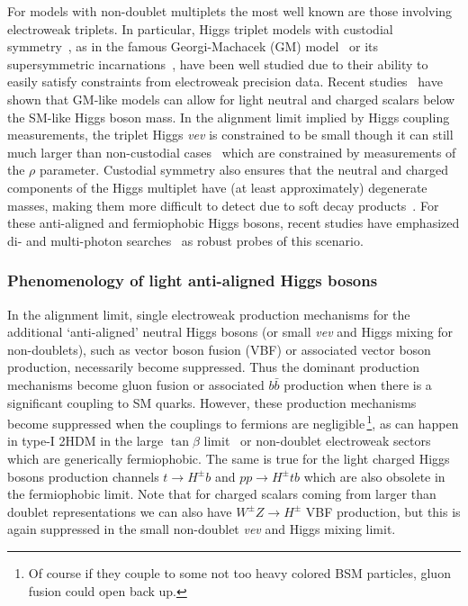 \documentclass[../report.tex]{subfiles}
\begin{document}
For models with non-doublet multiplets the most well known are those involving electroweak triplets. In particular, Higgs triplet models with custodial symmetry~\cite{Sikivie:1980hm}, as in the famous Georgi-Machacek (GM) model~\cite{Georgi:1985nv,Chanowitz:1985ug,Gunion:1989ci,Gunion:1990dt,Hartling:2014zca} or its supersymmetric incarnations~\cite{Cort:2013foa,Garcia-Pepin:2014yfa,Vega:2017gkk}, have been well studied due to their ability to easily satisfy constraints from electroweak precision data. Recent studies~\cite{Davoudiasl:2004aj,Vega:2017gkk,Vega:2018ddp} have shown that GM-like models can allow for light neutral and charged scalars below the SM-like Higgs boson mass. In the alignment limit implied by Higgs coupling measurements, the triplet Higgs \emph{vev} is constrained to be small though it can still much larger than non-custodial cases~\cite{Tanabashi:2018oca,Haber:1999zh} which are constrained by measurements of the $\rho$ parameter. Custodial symmetry also ensures that the neutral and charged components of the Higgs multiplet have (at least approximately) degenerate masses, making them more difficult to detect due to soft decay products~\cite{Buckley:2009kv,Ismail:2016zby}. For these anti-aligned and fermiophobic Higgs bosons, recent studies have emphasized di- and multi-photon searches~\cite{Aaltonen:2016fnw,Delgado:2016arn,Brooijmans:2016vro,Vega:2018ddp} as robust probes of this scenario.

\subsubsection{Phenomenology of light anti-aligned Higgs bosons}\label{sec:pheno}

In the alignment limit, single electroweak production mechanisms for the
additional `anti-aligned' neutral Higgs bosons (or small \emph{vev} and Higgs mixing for non-doublets), such as vector boson fusion (VBF) or associated vector boson production, necessarily become suppressed. Thus the dominant production mechanisms become gluon fusion or associated $b\bar{b}$ production when there is a significant coupling to SM quarks. However, these production mechanisms become suppressed when the couplings to fermions are negligible\,\footnote{Of course if they couple to some not too heavy colored BSM particles, gluon fusion could open back up.}, as can happen in type-I 2HDM in the large $\tan\beta$ limit~\cite{Akeroyd:2003bt} or non-doublet electroweak sectors which are generically fermiophobic. The same is true for the light charged Higgs bosons production channels $t \to H^\pm b$ and $pp \to H^\pm t b$ which are also obsolete in the fermiophobic limit. Note that for charged scalars coming from larger than doublet representations we can also have $W^\pm Z \to H^\pm$ VBF production, but this is again suppressed in the small non-doublet \emph{vev} and Higgs mixing limit. 
\end{document}
